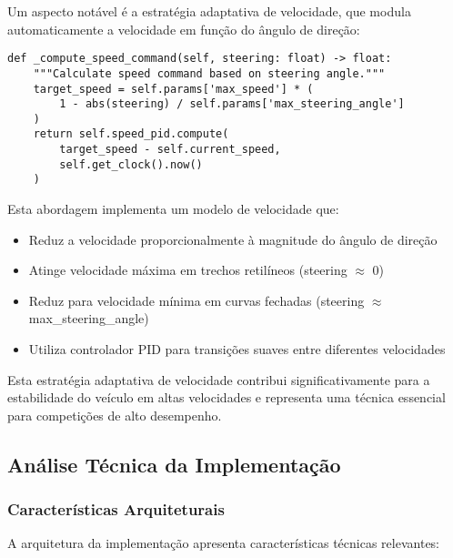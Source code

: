 Um aspecto notável é a estratégia adaptativa de velocidade, que modula
automaticamente a velocidade em função do ângulo de direção:

\begin{verbatim}
def _compute_speed_command(self, steering: float) -> float:
    """Calculate speed command based on steering angle."""
    target_speed = self.params['max_speed'] * (
        1 - abs(steering) / self.params['max_steering_angle']
    )
    return self.speed_pid.compute(
        target_speed - self.current_speed,
        self.get_clock().now()
    )
\end{verbatim}

Esta abordagem implementa um modelo de velocidade que:
\begin{itemize}
    \item Reduz a velocidade proporcionalmente à magnitude do ângulo de direção
    \item Atinge velocidade máxima em trechos retilíneos (steering $\approx$ 0)
    \item Reduz para velocidade mínima em curvas fechadas (steering $\approx$
          max\_steering\_angle)
    \item Utiliza controlador PID para transições suaves entre diferentes velocidades
\end{itemize}

Esta estratégia adaptativa de velocidade contribui significativamente para a
estabilidade do veículo em altas velocidades e representa uma técnica essencial
para competições de alto desempenho.

\subsection{Análise Técnica da Implementação}

\subsubsection{Características Arquiteturais}

A arquitetura da implementação apresenta características técnicas relevantes:

